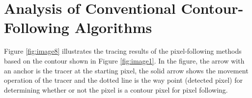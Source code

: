 \documentclass[sensors,article,accept,moreauthors,pdftex,10pt,a4paper]{mdpi}
\begin{document}

\section{Analysis of Conventional Contour-Following Algorithms}


Figure \ref{fig:image8} illustrates the tracing results of the pixel-following methods based on the contour shown in Figure \ref{fig:image1}. In the figure, the arrow with an anchor is the tracer at the starting pixel, the solid arrow shows the movement operation of the tracer and the dotted line is the way point (detected pixel) for determining whether or not the pixel is a contour pixel for pixel following.
\end{document}
